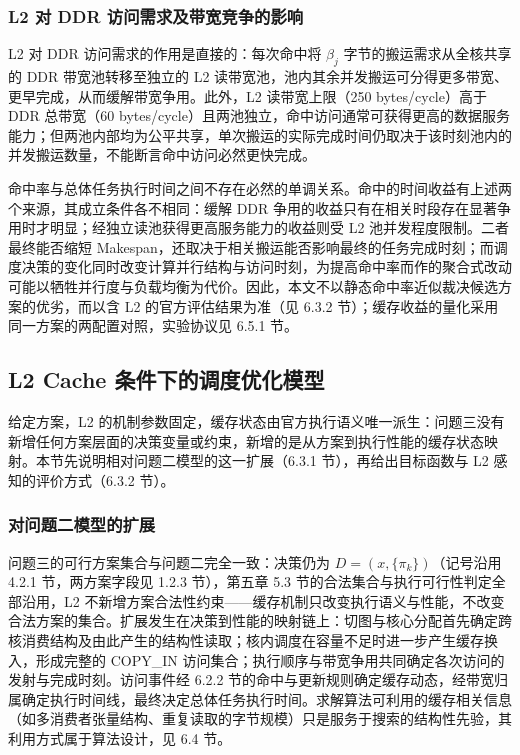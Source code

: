\subsubsection{L2 对 DDR 访问需求及带宽竞争的影响}

L2 对 DDR 访问需求的作用是直接的：每次命中将 $\beta_j$ 字节的搬运需求从全核共享的 DDR 带宽池转移至独立的 L2 读带宽池，池内其余并发搬运可分得更多带宽、更早完成，从而缓解带宽争用。此外，L2 读带宽上限（250 bytes/cycle）高于 DDR 总带宽（60 bytes/cycle）且两池独立，命中访问通常可获得更高的数据服务能力；但两池内部均为公平共享，单次搬运的实际完成时间仍取决于该时刻池内的并发搬运数量，不能断言命中访问必然更快完成。

命中率与总体任务执行时间之间不存在必然的单调关系。命中的时间收益有上述两个来源，其成立条件各不相同：缓解 DDR 争用的收益只有在相关时段存在显著争用时才明显；经独立读池获得更高服务能力的收益则受 L2 池并发程度限制。二者最终能否缩短 Makespan，还取决于相关搬运能否影响最终的任务完成时刻；而调度决策的变化同时改变计算并行结构与访问时刻，为提高命中率而作的聚合式改动可能以牺牲并行度与负载均衡为代价。因此，本文不以静态命中率近似裁决候选方案的优劣，而以含 L2 的官方评估结果为准（见 6.3.2 节）；缓存收益的量化采用同一方案的两配置对照，实验协议见 6.5.1 节。

\subsection{L2 Cache 条件下的调度优化模型}

给定方案，L2 的机制参数固定，缓存状态由官方执行语义唯一派生：问题三没有新增任何方案层面的决策变量或约束，新增的是从方案到执行性能的缓存状态映射。本节先说明相对问题二模型的这一扩展（6.3.1 节），再给出目标函数与 L2 感知的评价方式（6.3.2 节）。

\subsubsection{对问题二模型的扩展}

问题三的可行方案集合与问题二完全一致：决策仍为 $D=(x,\{\pi_k\})$（记号沿用 4.2.1 节，两方案字段见 1.2.3 节），第五章 5.3 节的合法集合与执行可行性判定全部沿用，L2 不新增方案合法性约束——缓存机制只改变执行语义与性能，不改变合法方案的集合。扩展发生在决策到性能的映射链上：切图与核心分配首先确定跨核消费结构及由此产生的结构性读取；核内调度在容量不足时进一步产生缓存换入，形成完整的 COPY\_IN 访问集合；执行顺序与带宽争用共同确定各次访问的发射与完成时刻。访问事件经 6.2.2 节的命中与更新规则确定缓存动态，经带宽归属确定执行时间线，最终决定总体任务执行时间。求解算法可利用的缓存相关信息（如多消费者张量结构、重复读取的字节规模）只是服务于搜索的结构性先验，其利用方式属于算法设计，见 6.4 节。

